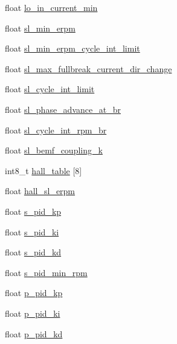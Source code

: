 \begin{DoxyCompactItemize}
\item 
float \hyperlink{structmc__configuration_ad101b945a41e86598b19b452f007923e}{lo\+\_\+in\+\_\+current\+\_\+min}
\item 
float \hyperlink{structmc__configuration_af80f4859ec2d84aa984c97ef356b758b}{sl\+\_\+min\+\_\+erpm}
\item 
float \hyperlink{structmc__configuration_aee0b0da633a6ebee014202131b4ac861}{sl\+\_\+min\+\_\+erpm\+\_\+cycle\+\_\+int\+\_\+limit}
\item 
float \hyperlink{structmc__configuration_a9e6ad133da71aca2d364a8ada768c353}{sl\+\_\+max\+\_\+fullbreak\+\_\+current\+\_\+dir\+\_\+change}
\item 
float \hyperlink{structmc__configuration_a81cccf58406c6dcbd2ac1f33584fdece}{sl\+\_\+cycle\+\_\+int\+\_\+limit}
\item 
float \hyperlink{structmc__configuration_af9abc755b896ab32e4977132ed46bcd0}{sl\+\_\+phase\+\_\+advance\+\_\+at\+\_\+br}
\item 
float \hyperlink{structmc__configuration_a0eb54e47a9bf75ccd98d883502a6970b}{sl\+\_\+cycle\+\_\+int\+\_\+rpm\+\_\+br}
\item 
float \hyperlink{structmc__configuration_a3b419e6bc7a36748a96271d4b1886c65}{sl\+\_\+bemf\+\_\+coupling\+\_\+k}
\item 
int8\+\_\+t \hyperlink{structmc__configuration_ad6dc27750aea4c7ee51b764b13787a91}{hall\+\_\+table} \mbox{[}8\mbox{]}
\item 
float \hyperlink{structmc__configuration_a5281292055aacf184ce7901009fe6d48}{hall\+\_\+sl\+\_\+erpm}
\item 
float \hyperlink{structmc__configuration_a943d7abfab2e78c3e9c2a742786b0c80}{s\+\_\+pid\+\_\+kp}
\item 
float \hyperlink{structmc__configuration_af7ca0aa3079984e6db212c28a9dd2a43}{s\+\_\+pid\+\_\+ki}
\item 
float \hyperlink{structmc__configuration_a81413d71782a05e9e011c90e2ffd1503}{s\+\_\+pid\+\_\+kd}
\item 
float \hyperlink{structmc__configuration_aeae9e433de624b8b78a8745ca64c1028}{s\+\_\+pid\+\_\+min\+\_\+rpm}
\item 
float \hyperlink{structmc__configuration_ac8f3cdb8123a874f020098dc2face160}{p\+\_\+pid\+\_\+kp}
\item 
float \hyperlink{structmc__configuration_a4f615fe7428171eea45871496b65d0f1}{p\+\_\+pid\+\_\+ki}
\item 
float \hyperlink{structmc__configuration_af479d5361b066a3450471994cbc4e287}{p\+\_\+pid\+\_\+kd}

\end{DoxyCompactItemize}

